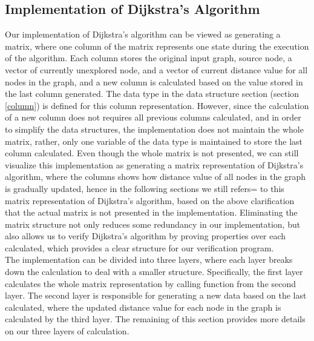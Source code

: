\subsection{Implementation of Dijkstra's Algorithm} \label{implementation}
Our implementation of Dijkstra's algorithm can be viewed as generating a matrix, where one column of the matrix represents one state during the execution of the algorithm. Each column stores the original input graph, source node, a vector of currently unexplored node, and a vector of current distance value for all nodes in the graph, and a new column is calculated based on the value stored in the last column generated. The  data type in the data structure section (section \ref{column}) is defined for this column representation. However, since the calculation of a new column does not requires all previous columns calculated, and in order to simplify the data structures, the implementation does not maintain the whole matrix, rather, only one variable of the  data type is maintained to store the last column calculated. Even though the whole matrix is not presented, we can still visualize this implementation as generating a matrix representation of Dijkstra's algorithm, where the columns shows how distance value of all nodes in the graph is gradually updated, hence in the following sections we still refers= to this matrix representation of Dijkstra's algorithm, based on the above clarification that the actual matrix is not presented in the implementation. Eliminating the matrix structure not only reduces some redundancy in our implementation, but also allows us to verify Dijkstra's algorithm by proving properties over each  calculated, which provides a clear structure for our verification program.
\\

The implementation can be divided into three layers, where each layer breaks down the calculation to deal with a smaller structure. Specifically, the first layer calculates the whole matrix representation by calling function from the second layer. The second layer is responsible for generating a new  data based on the last  calculated, where the updated distance value for each node in the graph is calculated by the third layer. The remaining of this section provides more details on our three layers of calculation. 
\\

